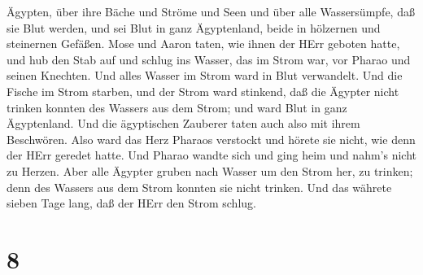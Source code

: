 Ägypten, über ihre Bäche und Ströme und Seen und über alle Wassersümpfe,
daß sie Blut werden, und sei Blut in ganz Ägyptenland, beide in
hölzernen und steinernen Gefäßen.  Mose und Aaron taten,
wie ihnen der HErr geboten hatte, und hub den Stab auf und schlug ins
Wasser, das im Strom war, vor Pharao und seinen Knechten. Und alles
Wasser im Strom ward in Blut verwandelt.  Und die Fische im
Strom starben, und der Strom ward stinkend, daß die Ägypter nicht
trinken konnten des Wassers aus dem Strom; und ward Blut in ganz
Ägyptenland.  Und die ägyptischen Zauberer taten auch also
mit ihrem Beschwören. Also ward das Herz Pharaos verstockt und hörete
sie nicht, wie denn der HErr geredet hatte.  Und Pharao
wandte sich und ging heim und nahm's nicht zu Herzen.  Aber
alle Ägypter gruben nach Wasser um den Strom her, zu trinken; denn des
Wassers aus dem Strom konnten sie nicht trinken.  Und das
währete sieben Tage lang, daß der HErr den Strom schlug.

\hypertarget{section-7}{%
\section{8}\label{section-7}}

